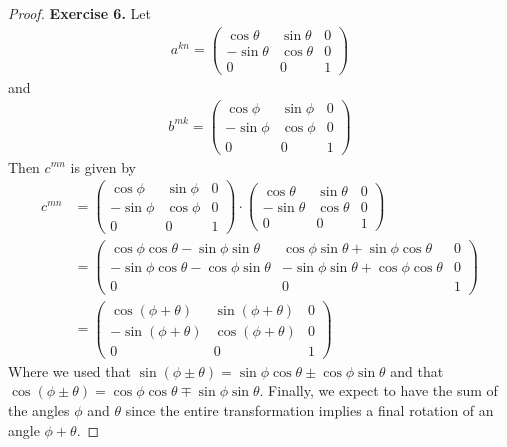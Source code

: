 \documentclass[11pt]{article}
\theoremstyle{definition}
\begin{document}
\begin{proof}{\textbf{Exercise 6.}}
    Let
    \begin{align*}
        a^{kn} = 
        \begin{pmatrix}
            \cos\theta & \sin\theta & 0\\
            -\sin\theta & \cos\theta & 0\\
            0 & 0 & 1
        \end{pmatrix}
    \end{align*}
    and
    \begin{align*}
        b^{mk} = 
        \begin{pmatrix}
            \cos\phi & \sin\phi & 0\\
            -\sin\phi & \cos\phi & 0\\
            0 & 0 & 1
        \end{pmatrix}
    \end{align*}
    Then $c^{mn}$ is given by
    \begin{align*}
        c^{mn} &= 
        \begin{pmatrix}
            \cos\phi & \sin\phi & 0\\
            -\sin\phi & \cos\phi & 0\\
            0 & 0 & 1
        \end{pmatrix}
        \cdot
        \begin{pmatrix}
            \cos\theta & \sin\theta & 0\\
            -\sin\theta & \cos\theta & 0\\
            0 & 0 & 1
        \end{pmatrix}\\
        &= 
        \begin{pmatrix}
            \cos\phi\cos\theta - \sin\phi\sin\theta
            & \cos\phi\sin\theta + \sin\phi\cos\theta
            & 0\\
            -\sin\phi\cos\theta - \cos\phi\sin\theta
            & -\sin\phi\sin\theta + \cos\phi\cos\theta
            & 0\\
            0 & 0 & 1
        \end{pmatrix}\\
        &=
        \begin{pmatrix}
            \cos(\phi +\theta) & \sin(\phi + \theta) & 0\\
            -\sin(\phi + \theta) & \cos(\phi + \theta) & 0\\
            0 & 0 & 1
        \end{pmatrix}
    \end{align*}
    Where we used that
    $\sin(\phi \pm \theta) = \sin\phi\cos\theta \pm \cos\phi\sin\theta$
    and that
    $\cos(\phi \pm \theta) = \cos\phi\cos\theta \mp \sin\phi\sin\theta$.
    Finally, we expect to have the sum of the angles $\phi$ and $\theta$ since
    the entire transformation implies a final rotation of an angle $\phi + \theta$.  
\end{proof}
\end{document}
